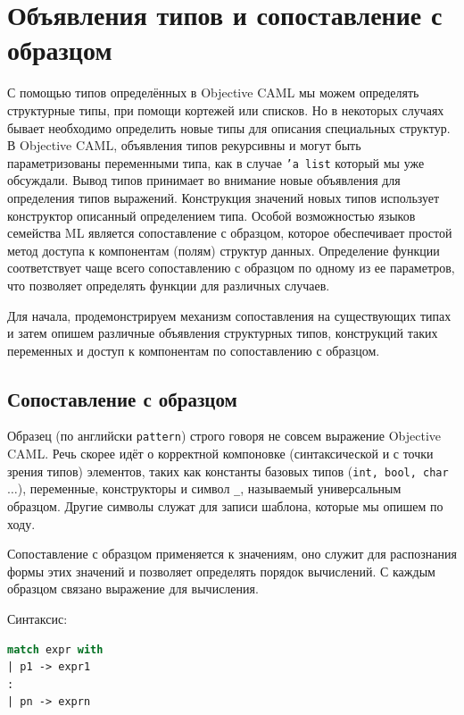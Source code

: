 \section{Объявления типов и сопоставление с образцом}
\label{sec:types_and_pattern_matching}

С помощью типов определённых в Objective CAML мы можем определять структурные
типы, при помощи кортежей или списков. Но в некоторых случаях бывает необходимо
определить новые типы для описания специальных структур. В Objective CAML,
объявления типов рекурсивны и могут быть параметризованы переменными типа, как в
случае \texttt{'a list} который мы уже обсуждали. Вывод типов принимает во
внимание новые объявления для определения типов выражений. Конструкция значений
новых типов использует конструктор описанный определением типа. Особой
возможностью языков семейства ML является сопоставление с образцом, которое
обеспечивает простой метод доступа к компонентам (полям) структур данных.
Определение функции соответствует чаще всего сопоставлению с образцом по одному
из ее параметров, что позволяет определять функции для различных случаев.

Для начала, продемонстрируем механизм сопоставления на существующих типах и
затем опишем различные объявления структурных типов, конструкций таких
переменных и доступ к компонентам по сопоставлению с образцом.

\subsection{Сопоставление с образцом}

Образец (по английски \texttt{pattern}) строго говоря не совсем выражение
Objective CAML. Речь скорее идёт о корректной компоновке (синтаксической и с
точки зрения типов) элементов, таких как константы базовых типов (\texttt{int,
bool, char $\ldots$}), переменные, конструкторы и символ \texttt{\_}, называемый
универсальным образцом. Другие символы служат для записи шаблона, которые мы
опишем по ходу.

Сопоставление с образцом применяется к значениям, оно служит для распознания
формы этих значений и позволяет определять порядок вычислений. С каждым образцом
связано выражение для вычисления.

Синтаксис:

\begin{lstlisting}[language=OCaml]
match expr with
| p1 -> expr1
:
| pn -> exprn
\end{lstlisting}

